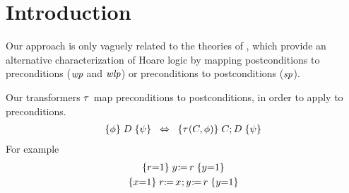 \section{Introduction}

Our approach is only vaguely related to the theories of
\citet{DBLP:journals/cacm/Dijkstra75}, which provide an alternative
characterization of Hoare logic by mapping postconditions to preconditions
($\textit{wp}$ and $\textit{wlp}$) or preconditions to postconditions ($\textit{sp}$).

Our transformers $\tau^{}$ map preconditions to postconditions, in order to
apply to preconditions.
\begin{align*}
  \{\phi\}\allowbreak\;D\;\allowbreak\{\psi\}
  \;\;\Leftrightarrow\;\;
  \{\tau^{}(C,\phi)\}\allowbreak\;C\mathtt{;}\,\allowbreak D\;\allowbreak\{\psi\}
\end{align*}
For example
\begin{gather*}
  \hoare{r{=}1}{\PW{y}{r}}{y{=}1}
  \\
  \hoare{x{=}1}{\PR{x}{r}\SEMI\PW{y}{r}}{y{=}1}
\end{gather*}


\endinput

This paper builds on
\cite{2019-sp} and
\cite{10.1145/3428262}.


Pomsets are a nice model of concurrent computation.
Predicate transformers are a nice model of sequential computation.
We show how these interact.

We do this by attaching predicate transformers to \emph{configurations}.

Thus the amount of transformation depends on which read events are seen in
the configuration.

We develop the theory of pomsets with predicate transformers, then apply the
theory to model relaxed memory.

Other things we could model include Map/Reduce and Fork/Join.
